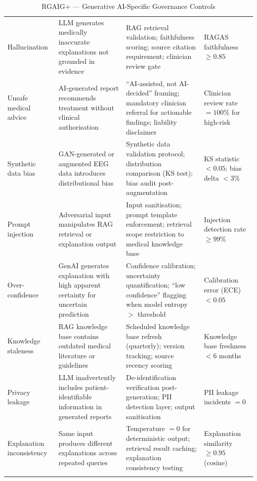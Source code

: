 \begingroup\singlespacing\tablefontsize\tablestripes
\begin{xltabular}{\textwidth}{@{} p{3.0cm} X X p{3.5cm} @{}}
\caption{RGAIG+ --- Generative AI-Specific Governance Controls}
\label{tab:rgaig_genai_controls}\\
\toprule
{} &  &  &  \\
\midrule
\endfirsthead
\endhead
\bottomrule
\endlastfoot
Hallucination              & LLM generates medically inaccurate explanations not grounded in evidence & RAG retrieval validation; faithfulness scoring; source citation requirement; clinician review gate & RAGAS faithfulness $\geq 0.85$ \\
\addlinespace
Unsafe medical advice      & AI-generated report recommends treatment without clinical authorisation & ``AI-assisted, not AI-decided'' framing; mandatory clinician referral for actionable findings; liability disclaimer & Clinician review rate $= 100\%$ for high-risk \\
\addlinespace
Synthetic data bias        & GAN-generated or augmented EEG data introduces distributional bias & Synthetic data validation protocol; distribution comparison (KS test); bias audit post-augmentation & KS statistic $< 0.05$; bias delta $< 3\%$ \\
\addlinespace
Prompt injection           & Adversarial input manipulates RAG retrieval or explanation output & Input sanitisation; prompt template enforcement; retrieval scope restriction to medical knowledge base & Injection detection rate $\geq 99\%$ \\
\addlinespace
Over-confidence            & GenAI generates explanation with high apparent certainty for uncertain prediction & Confidence calibration; uncertainty quantification; ``low confidence'' flagging when model entropy $>$ threshold & Calibration error (ECE) $< 0.05$ \\
\addlinespace
Knowledge staleness        & RAG knowledge base contains outdated medical literature or guidelines & Scheduled knowledge base refresh (quarterly); version tracking; source recency scoring & Knowledge base freshness $< 6$ months \\
\addlinespace
Privacy leakage            & LLM inadvertently includes patient-identifiable information in generated reports & De-identification verification post-generation; PII detection layer; output sanitisation & PII leakage incidents $= 0$ \\
\addlinespace
Explanation inconsistency  & Same input produces different explanations across repeated queries & Temperature $= 0$ for deterministic output; retrieval result caching; explanation consistency testing & Explanation similarity $\geq 0.95$ (cosine) \\
\addlinespace
\midrule
{} \\
\end{xltabular}
\endgroup

\clearpage
